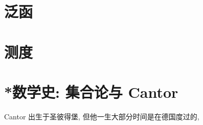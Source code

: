 \documentclass[cn,toc=twocol]{elegantbook}
\begin{document}

\section{泛函}


\section{测度}


\section{*数学史: 集合论与 Cantor}

Cantor 出生于圣彼得堡, 但他一生大部分时间是在德国度过的, 




\end{document}

